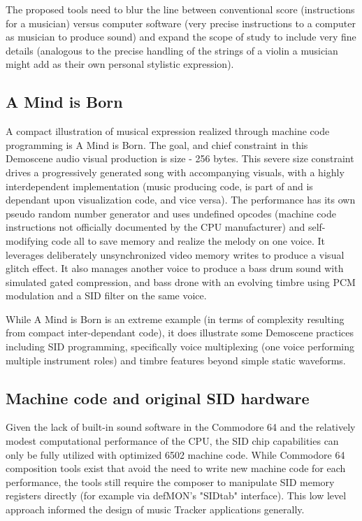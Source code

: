 \documentclass[10pt]{article}
\begin{document}
\begin{multicols*}{2}
The proposed tools need to blur the line between conventional score (instructions for a musician) versus computer software (very precise instructions to a computer as musician to produce sound) and expand the scope of study to include very fine details (analogous to the precise handling of the strings of a violin a musician might add as their own personal stylistic expression).

\subsection{A Mind is Born}
\label{amib}

A compact illustration of musical expression realized through machine code programming is A Mind is Born\cite{amib}. The goal, and chief constraint in this Demoscene audio visual production is size - 256 bytes. This severe size constraint drives a progressively generated song with accompanying visuals, with a highly interdependent implementation (music producing code, is part of and is dependant upon visualization code, and vice versa). The performance has its own pseudo random number generator and uses undefined opcodes (machine code instructions not officially documented by the CPU manufacturer) and self-modifying code all to save memory and realize the melody on one voice. It leverages deliberately unsynchronized video memory writes to produce a visual glitch effect. It also manages another voice to produce a bass drum sound with simulated gated compression, and bass drone with an evolving timbre using PCM modulation and a SID filter on the same voice.

While A Mind is Born is an extreme example (in terms of complexity resulting from compact inter-dependant code), it does illustrate some Demoscene practices including SID programming, specifically voice multiplexing (one voice performing multiple instrument roles) and timbre features beyond simple static waveforms.

\subsection{Machine code and original SID hardware}

Given the lack of built-in sound software in the Commodore 64 and the relatively modest computational performance of the CPU, the SID chip capabilities can only be fully utilized with optimized 6502 machine code\cite{c64digi}. While Commodore 64 composition tools exist that avoid the need to write new machine code for each performance, the tools still require the composer to manipulate SID memory registers directly (for example via defMON's\cite{defmon} "SIDtab" interface). This low level approach informed the design of music Tracker applications generally\cite{trackers}.


\end{multicols*}
\end{document}
